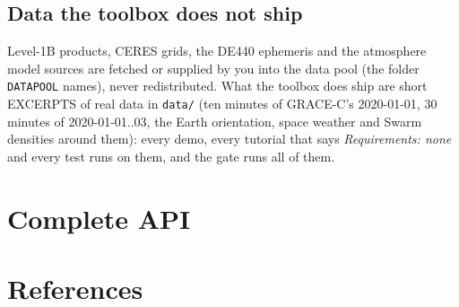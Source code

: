 \documentclass[11pt,a4paper]{report}
\begin{document}
\section{Data the toolbox does not ship}
Level-1B products, CERES grids, the DE440 ephemeris and the atmosphere model sources are fetched or
supplied by you into the data pool (the folder \texttt{DATAPOOL} names), never redistributed. What
the toolbox does ship are short EXCERPTS of real data in \texttt{data/} (ten minutes of GRACE-C's
2020-01-01, 30 minutes of 2020-01-01..03, the Earth orientation, space weather and Swarm densities
around them): every demo, every tutorial that says \emph{Requirements: none} and every test runs on
them, and the gate runs all of them.

\appendix
\chapter{Complete API}
\label{ch:api}


\chapter{References}

\end{document}

